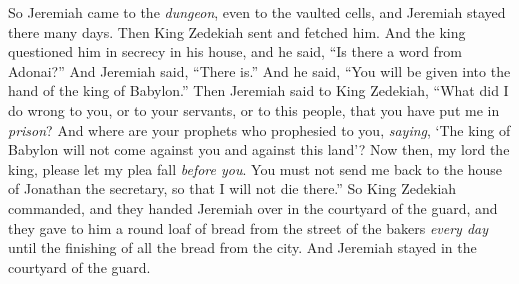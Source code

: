\begin{biblechapter}
\verse So Jeremiah came to the \textit{dungeon}, even to the vaulted cells, and Jeremiah stayed there many days.
\verse Then King Zedekiah sent and fetched him. And the king questioned him in secrecy in his house, and he said, “Is there a word from Adonai?” And Jeremiah said, “There is.” And he said, “You will be given into the hand of the king of Babylon.”
\verse Then Jeremiah said to King Zedekiah, “What did I do wrong to you, or to your servants, or to this people, that you have put me in \textit{prison}?
\verse And where are your prophets who prophesied to you, \textit{saying}, ‘The king of Babylon will not come against you and against this land’?
\verse Now then, my lord the king, please let my plea fall \textit{before you}. You must not send me back to the house of Jonathan the secretary, so that I will not die there.”
\verse So King Zedekiah commanded, and they handed Jeremiah over in the courtyard of the guard, and they gave to him a round loaf of bread from the street of the bakers \textit{every day} until the finishing of all the bread from the city. And Jeremiah stayed in the courtyard of the guard.
\end{biblechapter}

